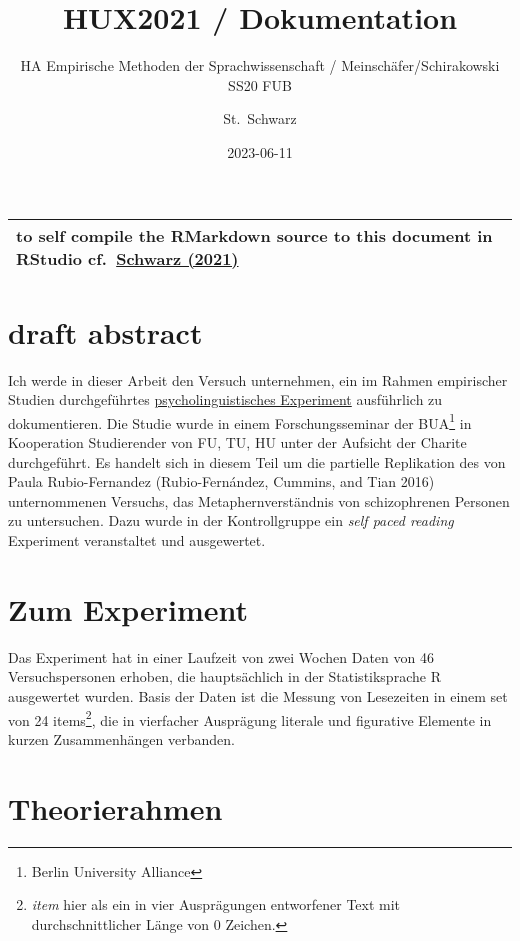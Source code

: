\documentclass[
]{article}
\title{HUX2021 / Dokumentation}
\subtitle{HA Empirische Methoden der Sprachwissenschaft / Meinschäfer/Schirakowski SS20 FUB}
\author{St.~Schwarz}
\date{2023-06-11}
\begin{document}
\maketitle

{
\setcounter{tocdepth}{2}
\tableofcontents
}
\begin{longtable}[]{@{}l@{}}
\toprule()
\endhead
to self compile the RMarkdown source to this document in RStudio cf.~\href{https://github.com/esteeschwarz/DH_essais/blob/main/sections/hux2021/rmd/hux_ha_main.Rmd}{Schwarz (2021)} \\
\bottomrule()
\end{longtable}

\hypertarget{draft-abstract}{%
\section{draft abstract}\label{draft-abstract}}

Ich werde in dieser Arbeit den Versuch unternehmen, ein im Rahmen empirischer Studien durchgeführtes \href{https://github.com/esteeschwarz/essais/docs/hux2021}{psycholinguistisches Experiment} ausführlich zu dokumentieren. Die Studie wurde in einem Forschungsseminar der BUA\footnote{Berlin University Alliance} in Kooperation Studierender von FU, TU, HU unter der Aufsicht der Charite durchgeführt. Es handelt sich in diesem Teil um die partielle Replikation des von Paula Rubio-Fernandez (Rubio-Fernández, Cummins, and Tian 2016) unternommenen Versuchs, das Metaphernverständnis von schizophrenen Personen zu untersuchen. Dazu wurde in der Kontrollgruppe ein \emph{self paced reading} Experiment veranstaltet und ausgewertet.

\hypertarget{zum-experiment}{%
\section{Zum Experiment}\label{zum-experiment}}

Das Experiment hat in einer Laufzeit von zwei Wochen Daten von 46 Versuchspersonen erhoben, die hauptsächlich in der Statistiksprache R ausgewertet wurden. Basis der Daten ist die Messung von Lesezeiten in einem set von 24 items\footnote{\emph{item} hier als ein in vier Ausprägungen entworfener Text mit durchschnittlicher Länge von 0 Zeichen.}, die in vierfacher Ausprägung literale und figurative Elemente in kurzen Zusammenhängen verbanden.

\hypertarget{theorierahmen}{%
\section{Theorierahmen}\label{theorierahmen}}
\end{document}

